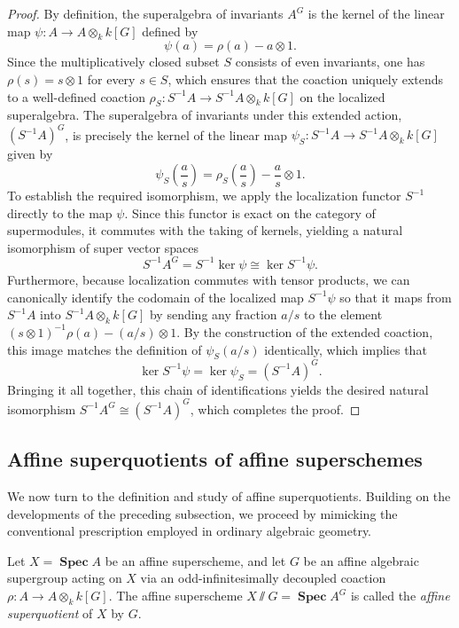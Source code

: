 \documentclass[11pt,a4paper,reqno,noamsfonts]{amsart}
\numberwithin{equation}{section}
\theoremstyle{definition}
\theoremstyle{remark}
\DeclareMathOperator{\sSpec}{\mathbf{Spec}}
\begin{document}
\begin{proof}
By definition, the superalgebra of invariants $A^{G}$ is the kernel of the linear map $\psi \colon A \to A \otimes_k k[G]$ defined by 
$$
\psi(a) = \rho(a) - a \otimes 1.
$$
Since the multiplicatively closed subset $S$ consists of even invariants, one has $\rho(s) = s \otimes 1$ for every $s \in S$, which ensures that the coaction uniquely extends to a well-defined coaction $\rho_S \colon S^{-1}A \to S^{-1}A \otimes_k k[G]$ on the localized superalgebra. The superalgebra of invariants under this extended action, $(S^{-1}A)^G$, is precisely the kernel of the linear map $\psi_S \colon S^{-1}A \to S^{-1}A \otimes_k k[G]$ given by
$$
 \psi_S\left( \frac{a}{s} \right) = \rho_S\left( \frac{a}{s} \right)  - \frac{a}{s} \otimes 1.
 $$
 To establish the required isomorphism, we apply the localization functor $S^{-1}$ directly to the map $\psi$. Since this functor is exact on the category of supermodules, it commutes with the taking of kernels, yielding a natural isomorphism of super vector spaces
$$
S^{-1} A^{G} = S^{-1} \ker \psi \cong \ker S^{-1} \psi. 
$$
Furthermore, because localization commutes with tensor products, we can canonically identify the codomain of the localized map $S^{-1}\psi$ so that it maps from $S^{-1}A$ into $S^{-1}A \otimes_k k[G]$ by sending any fraction $a/s$ to the element $(s \otimes 1)^{-1}\rho(a) - (a/s) \otimes 1$. By the construction of the extended coaction, this image matches the definition of $\psi_S(a/s)$ identically, which implies that 
$$
\ker S^{-1}\psi = \ker \psi_S = (S^{-1}A)^G.
$$
Bringing it all together, this chain of identifications yields the desired natural isomorphism $S^{-1} A^{G} \cong (S^{-1}A)^G$, which completes the proof.
\end{proof}

%
\subsection{Affine superquotients of affine superschemes}\label{sec:3.2}
We now turn to the definition and study of affine superquotients. Building on the developments of the preceding subsection, we proceed by mimicking the conventional prescription employed in ordinary algebraic geometry.

Let $X = \sSpec A$ be an affine superscheme, and let $G$ be an affine algebraic supergroup acting on $X$ via an odd-infinitesimally decoupled coaction $\rho \colon A \to A \otimes_k k[G]$. The affine superscheme $X {\sslash} G = \sSpec A^{G}$ is called the \emph{affine superquotient} of $X$ by $G$.
\end{document}
